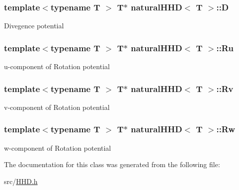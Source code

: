\subsubsection[{D}]{\setlength{\rightskip}{0pt plus 5cm}template$<$typename T $>$ T$\ast$ {\bf natural\+H\+H\+D}$<$ T $>$\+::D}\label{classnatural_h_h_d_a14be6c70a1d6e7e110d231311bfd9353}
Divegence potential \hypertarget{classnatural_h_h_d_acf29795e943a83e27809523fe7b2182e}{}
\subsubsection[{Ru}]{\setlength{\rightskip}{0pt plus 5cm}template$<$typename T $>$ T$\ast$ {\bf natural\+H\+H\+D}$<$ T $>$\+::Ru}\label{classnatural_h_h_d_acf29795e943a83e27809523fe7b2182e}
u-\/component of Rotation potential \hypertarget{classnatural_h_h_d_abcc7900aa4db9c2a48d7cea957f0193d}{}
\subsubsection[{Rv}]{\setlength{\rightskip}{0pt plus 5cm}template$<$typename T $>$ T$\ast$ {\bf natural\+H\+H\+D}$<$ T $>$\+::Rv}\label{classnatural_h_h_d_abcc7900aa4db9c2a48d7cea957f0193d}
v-\/component of Rotation potential \hypertarget{classnatural_h_h_d_a4c5da0a3fb928591bfb286f065ddf735}{}
\subsubsection[{Rw}]{\setlength{\rightskip}{0pt plus 5cm}template$<$typename T $>$ T$\ast$ {\bf natural\+H\+H\+D}$<$ T $>$\+::Rw}\label{classnatural_h_h_d_a4c5da0a3fb928591bfb286f065ddf735}
w-\/component of Rotation potential 

The documentation for this class was generated from the following file\+:\begin{DoxyCompactItemize}
\item 
src/\hyperlink{_h_h_d_8h}{H\+H\+D.\+h}\end{DoxyCompactItemize}
